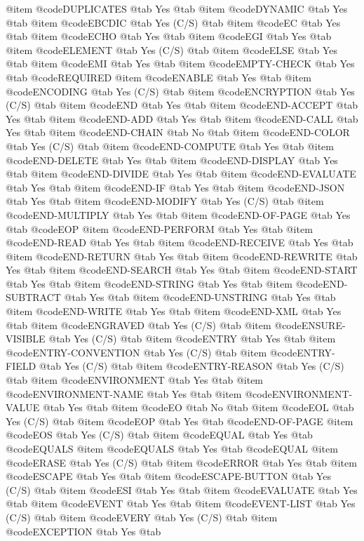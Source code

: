 @item @code{DUPLICATES} @tab Yes @tab 
@item @code{DYNAMIC} @tab Yes @tab 
@item @code{EBCDIC} @tab Yes	(C/S) @tab 
@item @code{EC} @tab Yes @tab 
@item @code{ECHO} @tab Yes @tab 
@item @code{EGI} @tab Yes @tab 
@item @code{ELEMENT} @tab Yes	(C/S) @tab 
@item @code{ELSE} @tab Yes @tab 
@item @code{EMI} @tab Yes @tab 
@item @code{EMPTY-CHECK} @tab Yes @tab @code{REQUIRED}
@item @code{ENABLE} @tab Yes @tab 
@item @code{ENCODING} @tab Yes	(C/S) @tab 
@item @code{ENCRYPTION} @tab Yes	(C/S) @tab 
@item @code{END} @tab Yes @tab 
@item @code{END-ACCEPT} @tab Yes @tab 
@item @code{END-ADD} @tab Yes @tab 
@item @code{END-CALL} @tab Yes @tab 
@item @code{END-CHAIN} @tab No @tab 
@item @code{END-COLOR} @tab Yes	(C/S) @tab 
@item @code{END-COMPUTE} @tab Yes @tab 
@item @code{END-DELETE} @tab Yes @tab 
@item @code{END-DISPLAY} @tab Yes @tab 
@item @code{END-DIVIDE} @tab Yes @tab 
@item @code{END-EVALUATE} @tab Yes @tab 
@item @code{END-IF} @tab Yes @tab 
@item @code{END-JSON} @tab Yes @tab 
@item @code{END-MODIFY} @tab Yes	(C/S) @tab 
@item @code{END-MULTIPLY} @tab Yes @tab 
@item @code{END-OF-PAGE} @tab Yes @tab @code{EOP}
@item @code{END-PERFORM} @tab Yes @tab 
@item @code{END-READ} @tab Yes @tab 
@item @code{END-RECEIVE} @tab Yes @tab 
@item @code{END-RETURN} @tab Yes @tab 
@item @code{END-REWRITE} @tab Yes @tab 
@item @code{END-SEARCH} @tab Yes @tab 
@item @code{END-START} @tab Yes @tab 
@item @code{END-STRING} @tab Yes @tab 
@item @code{END-SUBTRACT} @tab Yes @tab 
@item @code{END-UNSTRING} @tab Yes @tab 
@item @code{END-WRITE} @tab Yes @tab 
@item @code{END-XML} @tab Yes @tab 
@item @code{ENGRAVED} @tab Yes	(C/S) @tab 
@item @code{ENSURE-VISIBLE} @tab Yes	(C/S) @tab 
@item @code{ENTRY} @tab Yes @tab 
@item @code{ENTRY-CONVENTION} @tab Yes	(C/S) @tab 
@item @code{ENTRY-FIELD} @tab Yes	(C/S) @tab 
@item @code{ENTRY-REASON} @tab Yes	(C/S) @tab 
@item @code{ENVIRONMENT} @tab Yes @tab 
@item @code{ENVIRONMENT-NAME} @tab Yes @tab 
@item @code{ENVIRONMENT-VALUE} @tab Yes @tab 
@item @code{EO} @tab No @tab 
@item @code{EOL} @tab Yes	(C/S) @tab 
@item @code{EOP} @tab Yes @tab @code{END-OF-PAGE}
@item @code{EOS} @tab Yes	(C/S) @tab 
@item @code{EQUAL} @tab Yes @tab @code{EQUALS}
@item @code{EQUALS} @tab Yes @tab @code{EQUAL}
@item @code{ERASE} @tab Yes	(C/S) @tab 
@item @code{ERROR} @tab Yes @tab 
@item @code{ESCAPE} @tab Yes @tab 
@item @code{ESCAPE-BUTTON} @tab Yes	(C/S) @tab 
@item @code{ESI} @tab Yes @tab 
@item @code{EVALUATE} @tab Yes @tab 
@item @code{EVENT} @tab Yes @tab 
@item @code{EVENT-LIST} @tab Yes	(C/S) @tab 
@item @code{EVERY} @tab Yes	(C/S) @tab 
@item @code{EXCEPTION} @tab Yes @tab 
